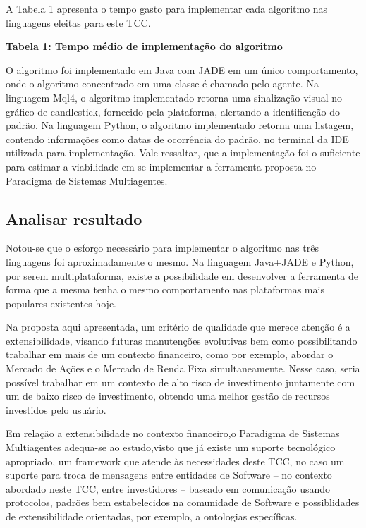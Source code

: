 A Tabela 1 apresenta o tempo gasto para implementar cada algoritmo nas linguagens eleitas para este TCC.

\textbf{Tabela 1: Tempo médio de implementação do algoritmo}

O algoritmo foi implementado em Java com JADE em um único comportamento, onde o algoritmo concentrado em uma classe é chamado pelo agente. Na linguagem Mql4, o algoritmo implementado retorna uma sinalização visual no gráfico de candlestick, fornecido pela plataforma, alertando a identificação do padrão. Na linguagem Python, o algoritmo implementado retorna uma listagem, contendo informações como datas de ocorrência do padrão, no terminal da IDE utilizada para implementação. Vale ressaltar, que a implementação foi o suficiente para estimar a viabilidade em se implementar a ferramenta proposta no Paradigma de Sistemas Multiagentes.


\subsection{Analisar resultado}

Notou-se que o esforço necessário para implementar o algoritmo nas três linguagens foi aproximadamente o mesmo. Na linguagem Java+JADE e Python, por serem multiplataforma, existe a possibilidade em desenvolver a ferramenta de forma que a mesma tenha o mesmo comportamento nas plataformas mais populares existentes hoje.

Na proposta aqui apresentada, um critério de qualidade que merece atenção é a extensibilidade, visando futuras manutenções evolutivas bem como possibilitando trabalhar em mais de um contexto financeiro, como por exemplo, abordar o Mercado de Ações e o Mercado de Renda Fixa simultaneamente. Nesse caso, seria possível trabalhar em um contexto de alto risco de investimento juntamente com um de baixo risco de investimento, obtendo uma melhor gestão de recursos investidos pelo usuário.

Em relação a extensibilidade no contexto financeiro,o Paradigma de Sistemas Multiagentes adequa-se ao estudo,visto que já existe um suporte tecnológico apropriado, um framework que atende às necessidades deste TCC, no caso um suporte para troca de mensagens entre entidades de Software – no contexto abordado neste TCC, entre investidores – baseado em comunicação usando protocolos, padrões bem estabelecidos na comunidade de Software e possiblidades de extensibilidade orientadas, por exemplo, a ontologias específicas.

